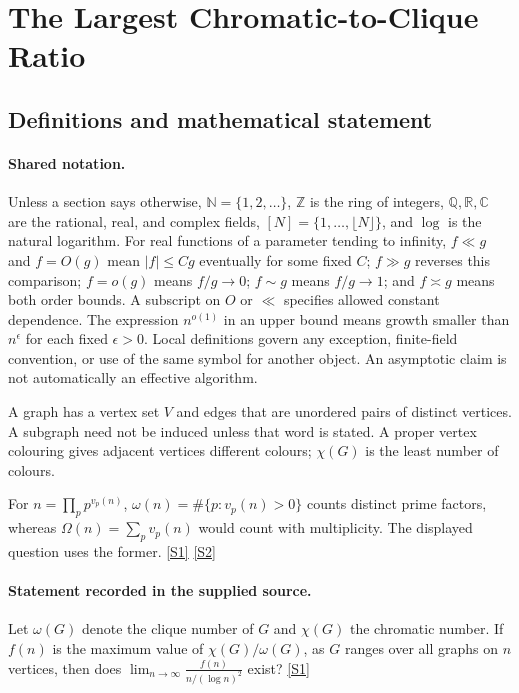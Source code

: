 \documentclass[11pt,a4paper]{article}
\newcommand{\N}{\mathbb{N}}
\newcommand{\Z}{\mathbb{Z}}
\newcommand{\Q}{\mathbb{Q}}
\newcommand{\R}{\mathbb{R}}
\newcommand{\C}{\mathbb{C}}
\newcommand{\sref}[2]{\hyperlink{source:#1:#2}{[S#2]}}
\begin{document}
\section{The Largest Chromatic-to-Clique Ratio}\label{statement}


\subsection{Definitions and mathematical statement}

\paragraph{Shared notation.}Unless a section says otherwise, $\N=\{1,2,\ldots\}$,
$\Z$ is the ring of integers, $\Q,\R,\C$ are the rational, real, and complex
fields, $[N]=\{1,\ldots,\lfloor N\rfloor\}$, and $\log$ is the natural
logarithm. For real functions of a parameter tending to infinity,
$f\ll g$ and $f=O(g)$ mean $|f|\leq Cg$ eventually for some fixed $C$;
$f\gg g$ reverses this comparison; $f=o(g)$ means $f/g\to0$;
$f\sim g$ means $f/g\to1$; and $f\asymp g$ means both order bounds.
A subscript on $O$ or $\ll$ specifies allowed constant dependence.
The expression $n^{o(1)}$ in an upper bound means growth smaller than
$n^\epsilon$ for each fixed $\epsilon>0$. Local definitions govern any
exception, finite-field convention, or use of the same symbol for another
object. An asymptotic claim is not automatically an effective algorithm.



A graph has a vertex set $V$ and edges that are unordered pairs of distinct vertices. A subgraph need not be induced unless that word is stated. A proper vertex colouring gives adjacent vertices different colours; $\chi(G)$ is the least number of colours.

For $n=\prod_pp^{v_p(n)}$, $\omega(n)=\#\{p:v_p(n)>0\}$ counts distinct prime factors, whereas $\Omega(n)=\sum_pv_p(n)$ would count with multiplicity. The displayed question uses the former. \sref{statement}{1} \sref{statement}{2}

\paragraph{Statement recorded in the supplied source.}
Let $\omega(G)$ denote the clique number of $G$ and $\chi(G)$ the chromatic number. If $f(n)$ is the maximum value of $\chi(G)/\omega(G)$, as $G$ ranges over all graphs on $n$ vertices, then does $ \lim_{n\to\infty}\frac{f(n)}{n/(\log n)^2} $ exist? \sref{statement}{1}
\end{document}
